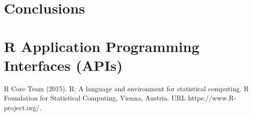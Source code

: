 \section{Conclusions}


\section{R Application Programming Interfaces (APIs)}





\begin{thebibliography}{00}

R Core Team (2015). 
\newblock R: A language and environment for statistical computing. R Foundation for Statistical Computing, Vienna, Austria.
\newblock URL https://www.R-project.org/.

\end{thebibliography}

